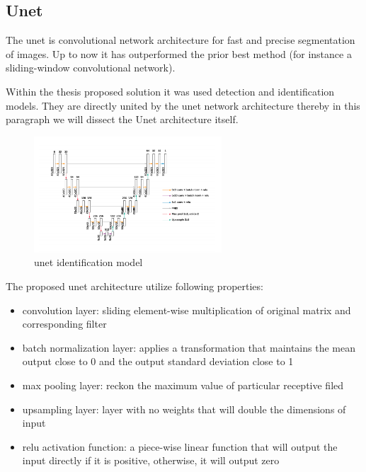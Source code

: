 \subsection{Unet}
The unet is convolutional network architecture for fast and precise segmentation of images. Up to now it has outperformed the prior best method (for instance a sliding-window convolutional network). 

Within the thesis proposed solution it was used detection and identification models. They are directly united by the unet network architecture thereby in this paragraph we will dissect the Unet architecture itself.

\begin{figure}[h]
    \centering \includegraphics[width=7cm]{images/identification_unet.png}
    \caption {unet identification model}
\end{figure}

The proposed unet architecture utilize following properties:
\begin{itemize}
    \item convolution layer: sliding element-wise multiplication of original matrix and corresponding filter %
    \item batch normalization layer: applies a transformation that maintains the mean output close to 0 and the output standard deviation close to 1
    \item max pooling layer: reckon the maximum value of particular receptive filed %
    \item upsampling layer: layer with no weights that will double the dimensions of input
    \item relu activation function: a piece-wise linear function that will output the input directly if it is positive, otherwise, it will output zero
\end{itemize}

